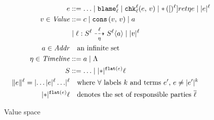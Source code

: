 \documentclass[preprint,onecolumn,9pt]{sigplanconf} %
\begin{document}
\begin{figure}
\begin{align*}
e &::= \ldots
\mid {\tt blame}^{\ell}_{\ell}
\mid {\tt chk}{^{\ell}_{\ell}}({e,\, v})
\mid {\tt *}{\,}({[})^{\ell}]{ret}{\eta}{e}
\mid \lvert e\rvert^{\ell}
\\
v \in \mathit{Value} &::=
    c
\mid {\tt \tt cons}{\,}({v,\, v})  
\mid a \\
&  \mid \ell : S^{\ell} \overset{\ell}{\underset{\eta}{\dashrightarrow}} S^{\ell} \langle a\rangle
\mid \lvert v\rvert^{\ell}
\\
a \in \mathit{Addr} &\quad\text{an infinite set} \\
\eta \in \mathit{Timeline} &::= a \mid \Lambda
\\
S &::= \ldots
\mid \lvert*\rvert^{{\tt flat}(e)}{\ell}
\\
\lVert e\rVert^{\ell} = \lvert \ldots \lvert e\rvert^{\ell} \ldots \rvert^{\ell}
&\quad\text{where $\forall$ labels $k$ and terms $e^\prime$, $e \neq \lvert e^\prime\rvert^{k}$}
\\
\lvert*\rvert^{{\tt flat}(e)}{\ell} &\quad\text{denotes the set of responsible parties $\overline{\ell}$}
\end{align*}
\caption{Value space}
\label{fig:values}
\end{figure}
\end{document}
